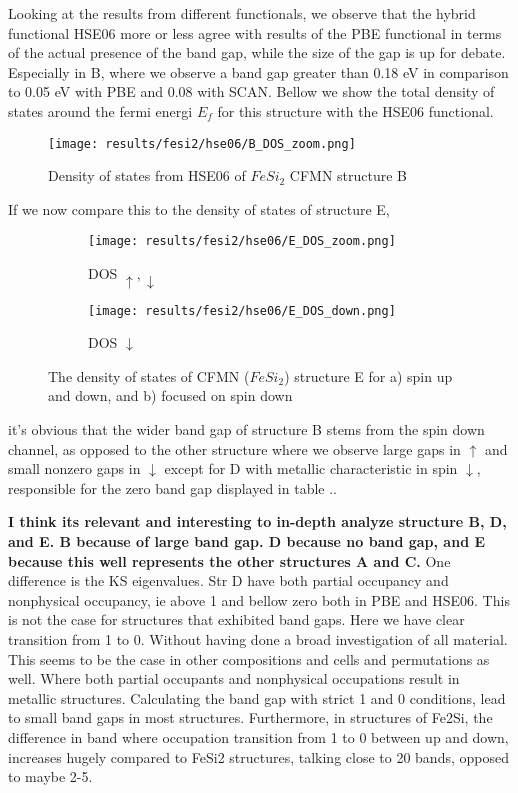 Looking at the results from different functionals, we observe that the hybrid functional HSE06 more or less agree with results of the PBE functional in terms of the actual presence of the band gap, while the size of the gap is up for debate. Especially in B, where we observe a band gap greater than 0.18 eV in comparison to 0.05 eV with PBE and 0.08 with SCAN. Bellow we show the total density of states around the fermi energi $E_f$ for this structure with the HSE06 functional. 

\begin{figure}[H]
\centering
\texttt{[image: results/fesi2/hse06/B\_DOS\_zoom.png]}
\caption{Density of states from HSE06 of $FeSi_2$ CFMN structure B}
\label{DOS_hse06_B}
\end{figure}

If we now compare this to the density of states of structure E,

\begin{figure}[H]
\begin{subfigure}{0.5\textwidth}
\texttt{[image: results/fesi2/hse06/E\_DOS\_zoom.png]}
\caption{DOS $\uparrow, \downarrow$}
\end{subfigure}
\hfill
\begin{subfigure}{0.5\textwidth}
\texttt{[image: results/fesi2/hse06/E\_DOS\_down.png]}
\caption{DOS $\downarrow$}
\end{subfigure}
\caption{The density of states of CFMN ($FeSi_2$) structure E for a) spin up and down, and b) focused on spin down}
\end{figure}

it's obvious that the wider band gap of structure B stems from the spin down channel, as opposed to the other structure where we observe large gaps in $\uparrow$ and small nonzero gaps in $\downarrow$ except for D with metallic characteristic in spin $\downarrow$, responsible for the zero band gap displayed in table ..

\textbf{I think its relevant and interesting to in-depth analyze structure B, D, and E. B because of large band gap. D because no band gap, and E because this well represents the other structures A and C. }
One difference is the KS eigenvalues. Str D have both partial occupancy and nonphysical occupancy, ie above 1 and bellow zero both in PBE and HSE06. This is not the case for structures that exhibited band gaps. Here we have clear transition from 1 to 0. Without having done a broad investigation of all material. This seems to be the case in other compositions and cells and permutations as well. Where both partial occupants and nonphysical occupations result in metallic structures. Calculating the band gap with strict 1 and 0 conditions, lead to small band gaps in most structures. Furthermore, in structures of Fe2Si, the difference in band where occupation transition from 1 to 0 between up and down, increases hugely compared to FeSi2 structures, talking close to 20 bands, opposed to maybe 2-5. 
